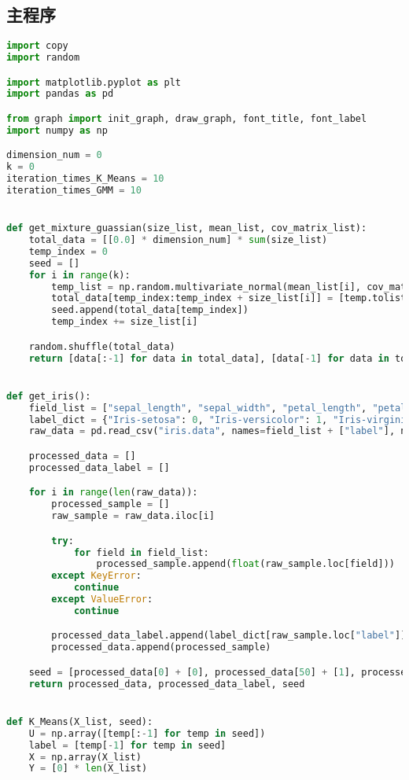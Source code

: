 \documentclass[withoutpreface,bwprint]{cumcmthesis}
\begin{document}
\newpage
\begin{appendix}
\section{主程序}
\begin{lstlisting}[language=python]
import copy
import random

import matplotlib.pyplot as plt
import pandas as pd

from graph import init_graph, draw_graph, font_title, font_label
import numpy as np

dimension_num = 0
k = 0
iteration_times_K_Means = 10
iteration_times_GMM = 10


def get_mixture_guassian(size_list, mean_list, cov_matrix_list):
    total_data = [[0.0] * dimension_num] * sum(size_list)
    temp_index = 0
    seed = []
    for i in range(k):
        temp_list = np.random.multivariate_normal(mean_list[i], cov_matrix_list[i], size_list[i])
        total_data[temp_index:temp_index + size_list[i]] = [temp.tolist() + [i] for temp in temp_list]
        seed.append(total_data[temp_index])
        temp_index += size_list[i]

    random.shuffle(total_data)
    return [data[:-1] for data in total_data], [data[-1] for data in total_data], seed


def get_iris():
    field_list = ["sepal_length", "sepal_width", "petal_length", "petal_width"]
    label_dict = {"Iris-setosa": 0, "Iris-versicolor": 1, "Iris-virginica": 2}
    raw_data = pd.read_csv("iris.data", names=field_list + ["label"], nrows=150)

    processed_data = []
    processed_data_label = []

    for i in range(len(raw_data)):
        processed_sample = []
        raw_sample = raw_data.iloc[i]

        try:
            for field in field_list:
                processed_sample.append(float(raw_sample.loc[field]))
        except KeyError:
            continue
        except ValueError:
            continue

        processed_data_label.append(label_dict[raw_sample.loc["label"]])
        processed_data.append(processed_sample)

    seed = [processed_data[0] + [0], processed_data[50] + [1], processed_data[100] + [2]]
    return processed_data, processed_data_label, seed


def K_Means(X_list, seed):
    U = np.array([temp[:-1] for temp in seed])
    label = [temp[-1] for temp in seed]
    X = np.array(X_list)
    Y = [0] * len(X_list)


\end{lstlisting}
\end{appendix}
\end{document}
